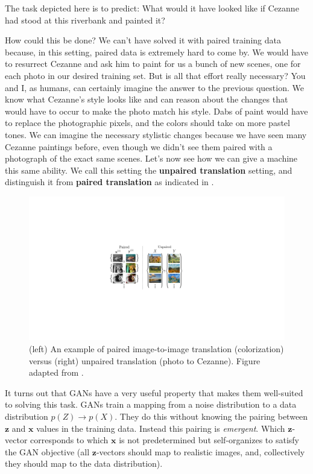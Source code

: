 The task depicted here is to predict: What would it have looked like if Cezanne had stood at this riverbank and painted it? %

How could this be done? We can't have solved it with paired training data because, in this setting, paired data is extremely hard to come by. We would have to resurrect Cezanne and ask him to paint for us a bunch of new scenes, one for each photo in our desired training set. But is all that effort really necessary? You and I, as humans, can certainly imagine the answer to the previous question. We know what Cezanne's style looks like and can reason about the changes that would have to occur to make the photo match his style. Dabs of paint would have to replace the photographic pixels, and the colors should take on more pastel tones. We can imagine the necessary stylistic changes because we have seen many Cezanne paintings before, even though we didn't see them paired with a photograph of the exact same scenes. Let's now see how we can give a machine this same ability. We call this setting the \textbf{unpaired translation} setting, and distinguish it from \textbf{paired translation} as indicated in \fig{\ref{fig:conditional_generative_models:paired_vs_unpaired}}.
\begin{figure}[h!]
    \centerline{
    \includegraphics[width=0.7\linewidth]{./figures/conditional_generative_models/paired_vs_unpaired.pdf}
    }
    \caption{(left) An example of paired image-to-image translation (colorization) versus (right) unpaired translation (photo to Cezanne). Figure adapted from \cite{CycleGAN2017}.}
    \label{fig:conditional_generative_models:paired_vs_unpaired}
\end{figure}

It turns out that GANs have a very useful property that makes them well-suited to solving this task. GANs train a mapping from a noise distribution to a data distribution $p(Z) \rightarrow p(X)$. They do this without knowing the pairing between $\mathbf{z}$ and $\mathbf{x}$ values in the training data. Instead this pairing is \textit{emergent}. Which $\mathbf{z}$-vector corresponds to which $\mathbf{x}$ is not predetermined but self-organizes to satisfy the GAN objective (all $\mathbf{z}$-vectors should map to realistic images, and, collectively they should map to the data distribution).

